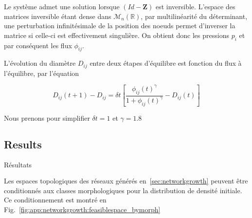 Le système admet une solution lorsque $\left(Id - \mathbf{Z}\right)$ est inversible. L'espace des matrices inversible étant dense dans $\mathcal{M}_n(\mathbb{R})$, par multilinéarité du déterminant, une perturbation infinitésimale de la position des noeuds permet d'inverser la matrice si celle-ci est effectivement singulière. On obtient donc les pressions $p_i$ et par conséquent les flux $\phi_{ij}$.


L'évolution du diamètre $D_{ij}$ entre deux étapes d'équilibre est fonction du flux à l'équilibre, par l'équation 

\[
D_{ij} (t+1) - D_{ij} = \delta t \left[ \frac{\phi_{ij}(t)^\gamma}{1 + \phi_{ij}(t)^\gamma} - D_{ij}(t)\right]
\]

Nous prenons pour simplifier $\delta t = 1$ et $\gamma = 1.8$




\subsection{Results}{Résultats}


Les espaces topologiques des réseaux générés en~\ref{sec:networkgrowth} peuvent être conditionnés aux classes morphologiques pour la distribution de densité initiale. Ce conditionnement est montré en Fig.~\ref{fig:app:networkgrowth:feasiblespace_bymorph}



